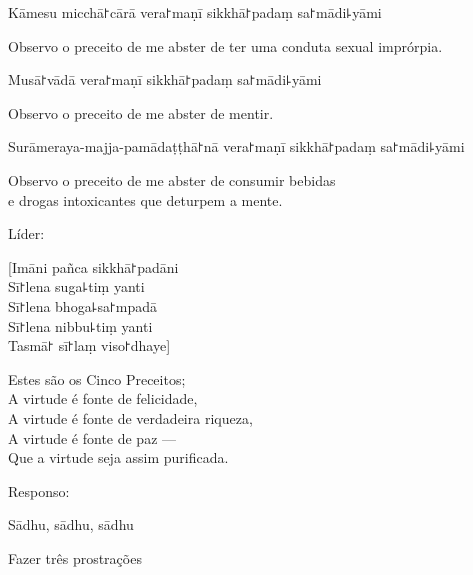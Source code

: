 \documentclass[
  babelLanguage=portuguese,
  final,
  showtrims,
]{chantingbook}
\begin{document}
\begin{precept}
  \setcounter{enumi}{2}
  \item Kāmesu micchā꜓cārā vera꜓maṇī sikkhā꜓padaṃ sa꜓mādi꜕yāmi
\end{precept}

\begin{english}
  Observo o preceito de me abster de ter uma conduta sexual imprórpia.
\end{english}

\begin{precept}
  \setcounter{enumi}{3}
  \item Musā꜓vādā vera꜓maṇī sikkhā꜓padaṃ sa꜓mādi꜕yāmi
\end{precept}

\enlargethispage{\baselineskip}

\begin{english}
  Observo o preceito de me abster de mentir.
\end{english}

\clearpage

\begin{precept}
  \setcounter{enumi}{4}
  \item Surāmeraya-majja-pamādaṭṭhā꜓nā vera꜓maṇī sikkhā꜓padaṃ sa꜓mādi꜕yāmi
\end{precept}

\begin{english}
  Observo o preceito de me abster de consumir bebidas\\
  e drogas intoxicantes que deturpem a mente.
\end{english}

\begin{instruction}
  Líder:
\end{instruction}

[Imāni pañca sikkhā꜓padāni\\
Sī꜓lena suga꜕tiṃ yanti\\
Sī꜓lena bhoga꜕sa꜓mpadā\\
Sī꜓lena nibbu꜕tiṃ yanti\\
Tasmā꜓ sī꜓laṃ viso꜓dhaye]

\begin{english}
  Estes são os Cinco Preceitos;\\
  A virtude é fonte de felicidade,\\
  A virtude é fonte de verdadeira riqueza,\\
  A virtude é fonte de paz ---\\
  Que a virtude seja assim purificada.
\end{english}

\begin{instruction}
  Responso:
\end{instruction}

Sādhu, sādhu, sādhu

\begin{instruction}
  Fazer três prostrações
\end{instruction}
\end{document}
